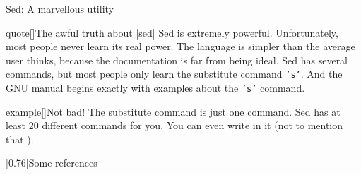 
\begin{frame}{Sed: A marvellous utility}
    \vspace{-3mm}
    \begin{varblock}{quote}[\textwidth]{The awful truth about \bash|sed|}
        \textnormal{Sed is extremely powerful.
        Unfortunately, most people never learn its real power.
        The language is simpler than the average user thinks, because the documentation is far from being ideal.
        Sed has several commands, but most people only learn the substitute command \texttt{'s'}.
        And the GNU manual begins exactly with examples about the \texttt{'s'} command.}
    \end{varblock}
    \vspace{-1mm}
    \begin{varblock}{example}[\textwidth]{Not bad!}
        The substitute command is just one command.
        Sed has at least 20 different commands for you.
        You can even write  in it (not to mention that ).
    \end{varblock}
    \vspace{-1mm}
    \begin{varblock*}{}[0.76\textwidth]{Some references}
         \\
         \\
        \\
    \end{varblock*}
\end{frame}
